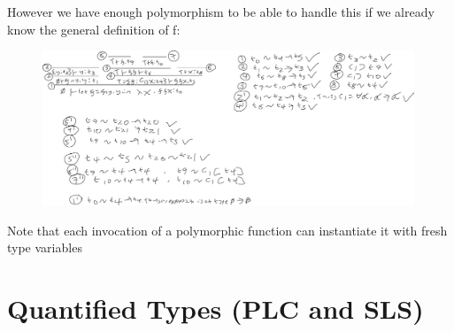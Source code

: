 \documentclass[20pt,a4paper,landscape]{extarticle}
\begin{document}
\begin{flushleft}
However we have enough polymorphism to be able to handle this if we already know the general definition of f:
\FloatBarrier
\begin{figure}[h]
\begin{center}
\includegraphics[width=0.99\textwidth]{meta/cs349/HTMI_Example3.pdf}{}
\end{center}
\end{figure}
\FloatBarrier
Note that each invocation of a polymorphic function can instantiate it with fresh type variables
\section{Quantified Types (PLC and SLS)}

\end{flushleft}
\end{document}
